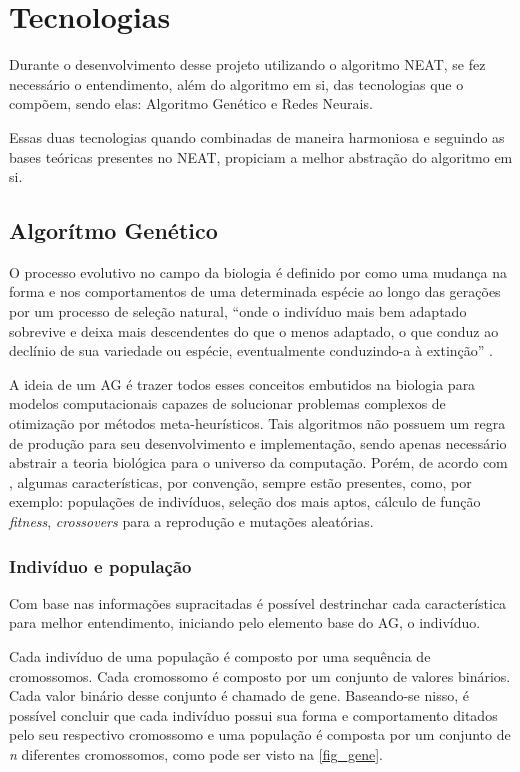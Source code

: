 \chapter{Tecnologias}

Durante o desenvolvimento desse projeto utilizando o algoritmo NEAT, se fez 
necessário o entendimento, além do algoritmo em si, das tecnologias que o compõem,
sendo elas: Algoritmo Genético e Redes Neurais. 

Essas duas tecnologias quando combinadas de maneira harmoniosa e 
seguindo as bases teóricas presentes no NEAT, propiciam a melhor abstração do 
algoritmo em si.

\section{Algor{\'i}tmo Gen{\'e}tico}

O processo evolutivo no campo da biologia é definido por
 como uma mudança na forma e
nos comportamentos de uma determinada espécie ao longo das
gerações por um processo de seleção natural, “onde o indivíduo
mais bem adaptado sobrevive e deixa mais descendentes do que o
menos adaptado, o que conduz ao declínio de sua variedade ou
espécie, eventualmente conduzindo-a à extinção”
\cite{do2009alfred}.

A ideia de um AG é trazer todos esses conceitos embutidos na
biologia para modelos computacionais capazes de solucionar
problemas complexos de otimização por métodos
meta-heurísticos. Tais algoritmos não possuem um regra de
produção para seu desenvolvimento e implementação, sendo
apenas necessário abstrair a teoria biológica para o universo
da computação. Porém, de acordo com
, algumas
características, por convenção, sempre estão presentes, como,
por exemplo: populações de indivíduos, seleção dos mais aptos,
cálculo de função \textit{fitness}, \textit{crossovers} para a reprodução e
mutações aleatórias.

\subsection{Indiv{\'i}duo e popula{\c c}{\~a}o}

Com base nas informações supracitadas é possível destrinchar
cada característica para melhor entendimento, iniciando pelo
elemento base do AG, o indivíduo.

Cada indivíduo de uma população é composto por uma sequência
de cromossomos. Cada cromossomo é composto por um conjunto de
valores binários. Cada valor binário desse conjunto é chamado
de gene. Baseando-se nisso, é possível concluir que cada
indivíduo possui sua forma e comportamento ditados pelo seu
respectivo cromossomo e uma população é composta por um
conjunto de \textit{n} diferentes cromossomos, como pode ser visto na
\autoref{fig_gene}.

